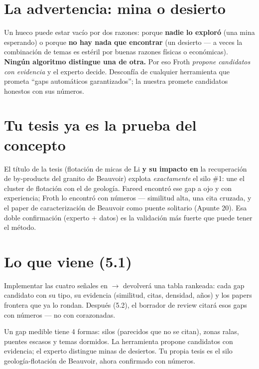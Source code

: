 \documentclass[11pt,a4paper]{article}
\begin{document}
\section{La advertencia: mina o desierto}

\begin{ojo}
Un hueco puede estar vacío por dos razones: porque \textbf{nadie lo exploró} (una mina
esperando) o porque \textbf{no hay nada que encontrar} (un desierto — a veces la combinación
de temas es estéril por buenas razones físicas o económicas). \textbf{Ningún algoritmo
distingue una de otra.} Por eso Froth \emph{propone candidatos con evidencia} y el experto
decide. Desconfía de cualquier herramienta que prometa ``gaps automáticos garantizados'';
la nuestra promete candidatos honestos con sus números.
\end{ojo}

\section{Tu tesis ya es la prueba del concepto}

El título de la tesis (flotación de micas de Li \textbf{y su impacto en} la recuperación de
by-products del granito de Beauvoir) explota \emph{exactamente} el silo \#1: une el cluster
de flotación con el de geología. Fareed encontró ese gap a ojo y con experiencia; Froth lo
encontró con números — similitud alta, una cita cruzada, y el paper de caracterización de
Beauvoir como puente solitario (Apunte 20). Esa doble confirmación (experto + datos) es la
validación más fuerte que puede tener el método.

\section{Lo que viene (5.1)}

Implementar las cuatro señales en  $\rightarrow$ 
devolverá una tabla rankeada: cada gap candidato con su tipo, su evidencia (similitud, citas,
densidad, años) y los papers frontera que ya lo rondan. Después (5.2), el borrador de review
citará esos gaps con números — no con corazonadas.

\begin{resumen}
Un gap medible tiene 4 formas: silos (parecidos que no se citan), zonas ralas, puentes
escasos y temas dormidos. La herramienta propone candidatos con evidencia; el experto
distingue minas de desiertos. Tu propia tesis es el silo geología-flotación de Beauvoir,
ahora confirmado con números.
\end{resumen}
\end{document}
